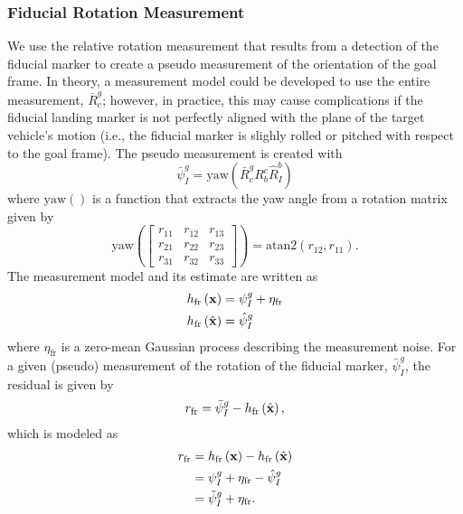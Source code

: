 \subsubsection{Fiducial Rotation Measurement}
We use the relative rotation measurement that results from a detection of the
fiducial marker
to create a pseudo measurement of the orientation of the goal frame. In theory,
a measurement model could be developed to use the entire measurement,
$\bar{R}_c^g$; however, in practice, this may cause complications if the
fiducial landing marker is not perfectly aligned with the plane of the target
vehicle's motion (i.e., the fiducial marker is slighly rolled or pitched with
respect to the goal frame).
The pseudo
measurement is created with
\begin{equation}
  \bar{\psi}_I^g = \text{yaw} \left( \bar{R}_c^g R_b^c \hat{R}_I^b \right)
\end{equation}
where $\text{yaw}\left(\right)$ is a function that extracts the yaw angle
from a rotation matrix
given by
\begin{equation}
  \text{yaw} \left(
    \begin{bmatrix}
      r_{11} & r_{12} & r_{13} \\
      r_{21} & r_{22} & r_{23} \\
      r_{31} & r_{32} & r_{33} 
    \end{bmatrix}
  \right)
  =
  \mathrm{atan2}\left( r_{12}, r_{11} \right).
\end{equation}
The measurement model and its estimate are
written as
\begin{align}
  h_{\text{fr}} \left( \boldsymbol{\mathrm{x}} \right) &= \psi_I^g + \eta_{\text{fr}} \\
  h_{\text{fr}} \left( \hat{\boldsymbol{\mathrm{x}}} \right) &= \hat{\psi}_I^g
\end{align}
where $\eta_{\text{fr}}$ is a zero-mean Gaussian process describing the
measurement noise.
For a given (pseudo) measurement of the rotation of the fiducial marker,
$\bar{\psi}_I^g$,
the residual is given by
\begin{equation}
  r_{\text{fr}} = \bar{\psi}_I^g - h_{\text{fr}} \left( \hat{\boldsymbol{\mathrm{x}}} \right),
\end{equation}
which is modeled as
\begin{align}
  r_{\text{fr}} &= h_{\text{fr}} \left( \boldsymbol{\mathrm{x}} \right) - h_{\text{fr}} \left( \hat{\boldsymbol{\mathrm{x}}} \right) \\
                &= \psi_I^g + \eta_{\text{fr}} - \hat{\psi}_I^g \\
                &= \tilde{\psi}_I^g + \eta_{\text{fr}}.
\end{align}
